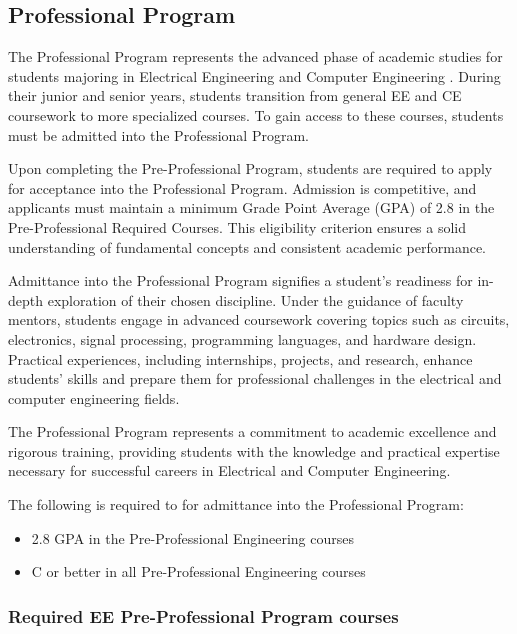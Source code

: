 \subsection{Professional Program}
\label{sec:professional-program}

The Professional Program  represents the advanced phase of academic studies for students majoring in Electrical Engineering and Computer Engineering . During their junior and senior years, students transition from general EE and CE coursework to more specialized courses. To gain access to these courses, students must be admitted into the Professional Program.

Upon completing the Pre-Professional Program, students are required to apply for acceptance into the Professional Program. Admission is competitive, and applicants must maintain a minimum Grade Point Average (GPA) of 2.8 in the Pre-Professional Required Courses. This eligibility criterion ensures a solid understanding of fundamental concepts and consistent academic performance.

Admittance into the Professional Program signifies a student's readiness for in-depth exploration of their chosen discipline. Under the guidance of faculty mentors, students engage in advanced coursework covering topics such as circuits, electronics, signal processing, programming languages, and hardware design. Practical experiences, including internships, projects, and research, enhance students' skills and prepare them for professional challenges in the electrical and computer engineering fields.

The Professional Program represents a commitment to academic excellence and rigorous training, providing students with the knowledge and practical expertise necessary for successful careers in Electrical and Computer Engineering.

The following is required to for admittance into the Professional Program:

\begin{itemize}
\item 2.8 GPA in the Pre-Professional Engineering courses
\item C or better in all Pre-Professional Engineering courses
\end{itemize}

\subsubsection{Required EE Pre-Professional Program courses}
\label{sec:required-ee-pre}



